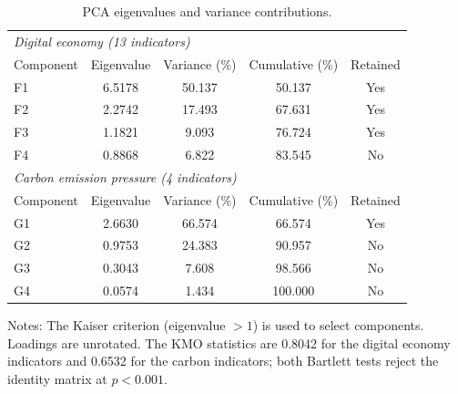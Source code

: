 \documentclass[economies,article,submit,moreauthors]{Definitions/mdpi}
\begin{document}
\begin{table}[H]
\centering
\caption{PCA eigenvalues and variance contributions.}
\label{tab:pca_eigen}
\small
\begin{threeparttable}
\begin{tabular}{lcccc}
\toprule
\multicolumn{5}{l}{\textit{Digital economy (13 indicators)}}\\
Component & Eigenvalue & Variance (\%) & Cumulative (\%) & Retained\\
\midrule
F1 & 6.5178 & 50.137 & 50.137 & Yes\\
F2 & 2.2742 & 17.493 & 67.631 & Yes\\
F3 & 1.1821 & 9.093 & 76.724 & Yes\\
F4 & 0.8868 & 6.822 & 83.545 & No\\
\midrule
\multicolumn{5}{l}{\textit{Carbon emission pressure (4 indicators)}}\\
Component & Eigenvalue & Variance (\%) & Cumulative (\%) & Retained\\
\midrule
G1 & 2.6630 & 66.574 & 66.574 & Yes\\
G2 & 0.9753 & 24.383 & 90.957 & No\\
G3 & 0.3043 & 7.608 & 98.566 & No\\
G4 & 0.0574 & 1.434 & 100.000 & No\\
\bottomrule
\end{tabular}
\begin{tablenotes}\footnotesize
\item Notes: The Kaiser criterion (eigenvalue $>1$) is used to select components. Loadings are unrotated. The KMO statistics are 0.8042 for the digital economy indicators and 0.6532 for the carbon indicators; both Bartlett tests reject the identity matrix at $p<0.001$.
\end{tablenotes}
\end{threeparttable}
\end{table}
\end{document}

